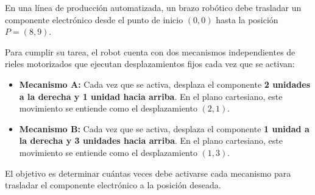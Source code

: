 \documentclass[compacto,10pt]{pubciencias-notas}
\begin{document}
\begin{ejer}[Aplicación]
En una línea de producción automatizada, un brazo robótico debe trasladar un componente electrónico desde el punto de inicio $(0,0)$ hasta la posición \textbf{$P = (8, 9)$}.

Para cumplir su tarea, el robot cuenta con dos mecanismos independientes de rieles motorizados que ejecutan desplazamientos fijos cada vez que se activan:

\begin{itemize}
    \item \textbf{Mecanismo A:} Cada vez que se activa, desplaza el componente \textbf{2 unidades a la derecha y 1 unidad hacia arriba}. En el plano cartesiano, este movimiento se entiende como el desplazamiento \textbf{$(2, 1)$}.
    \item \textbf{Mecanismo B:} Cada vez que se activa, desplaza el componente \textbf{1 unidad a la derecha y 3 unidades hacia arriba}. En el plano cartesiano, este movimiento se entiende como el desplazamiento \textbf{$(1, 3)$}.
\end{itemize}

El objetivo es determinar cuántas veces debe activarse cada mecanismo para trasladar el componente electrónico a la posición deseada.
\end{ejer}
\end{document}
